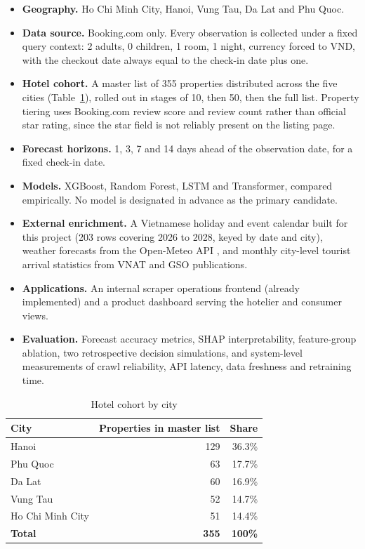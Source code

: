 \begin{itemize}[leftmargin=*]
    \item \textbf{Geography.} Ho Chi Minh City, Hanoi, Vung Tau, Da Lat and Phu Quoc.
    \item \textbf{Data source.} Booking.com only. Every observation is collected under a fixed query context: 2 adults, 0 children, 1 room, 1 night, currency forced to VND, with the checkout date always equal to the check-in date plus one.
    \item \textbf{Hotel cohort.} A master list of 355 properties distributed across the five cities (Table~\ref{tab:cohort}), rolled out in stages of 10, then 50, then the full list. Property tiering uses Booking.com review score and review count rather than official star rating, since the star field is not reliably present on the listing page.
    \item \textbf{Forecast horizons.} 1, 3, 7 and 14 days ahead of the observation date, for a fixed check-in date.
    \item \textbf{Models.} XGBoost, Random Forest, LSTM and Transformer, compared empirically. No model is designated in advance as the primary candidate.
    \item \textbf{External enrichment.} A Vietnamese holiday and event calendar built for this project (203 rows covering 2026 to 2028, keyed by date and city), weather forecasts from the Open-Meteo API \cite{openmeteo2024}, and monthly city-level tourist arrival statistics from VNAT and GSO publications.
    \item \textbf{Applications.} An internal scraper operations frontend (already implemented) and a product dashboard serving the hotelier and consumer views.
    \item \textbf{Evaluation.} Forecast accuracy metrics, SHAP interpretability, feature-group ablation, two retrospective decision simulations, and system-level measurements of crawl reliability, API latency, data freshness and retraining time.
\end{itemize}

\begin{table}[H]
\centering
\caption{Hotel cohort by city}
\label{tab:cohort}
\begin{tabular}{|l|r|r|}
\hline
\textbf{City} & \textbf{Properties in master list} & \textbf{Share} \\
\hline
Hanoi & 129 & 36.3\% \\
Phu Quoc & 63 & 17.7\% \\
Da Lat & 60 & 16.9\% \\
Vung Tau & 52 & 14.7\% \\
Ho Chi Minh City & 51 & 14.4\% \\
\hline
\textbf{Total} & \textbf{355} & \textbf{100\%} \\
\hline
\end{tabular}
\end{table}


